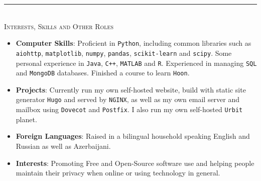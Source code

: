 \documentclass[10pt]{article}
\begin{document}
	\rule{\textwidth}{0.4pt}\\[0.2cm]
	\textsc{\Large Interests, Skills and Other Roles}
	\begin{itemize}[left=0pt]
		\item \textbf{Computer Skills}: Proficient in \texttt{Python}, including common libraries such as \texttt{aiohttp}, \texttt{matplotlib}, \texttt{numpy}, \texttt{pandas}, \texttt{scikit-learn} and \texttt{scipy}. Some personal experience in \texttt{Java}, \texttt{C++}, \texttt{MATLAB} and \texttt{R}. Experienced in managing \texttt{SQL} and \texttt{MongoDB} databases. Finished a course to learn \texttt{Hoon}.
		\item \textbf{Projects}: Currently run my own self-hosted website, build with static site generator \texttt{Hugo} and served by \texttt{NGINX}, as well as my own email server and mailbox using \texttt{Dovecot} and \texttt{Postfix}. I also run my own self-hosted \texttt{Urbit} planet. 
		\item \textbf{Foreign Languages}: Raised in a bilingual household speaking English and Russian as well as Azerbaijani.
		\item \textbf{Interests}: Promoting Free and Open-Source software use and helping people maintain their privacy when online or using technology in general. 
	\end{itemize}
\end{document}
